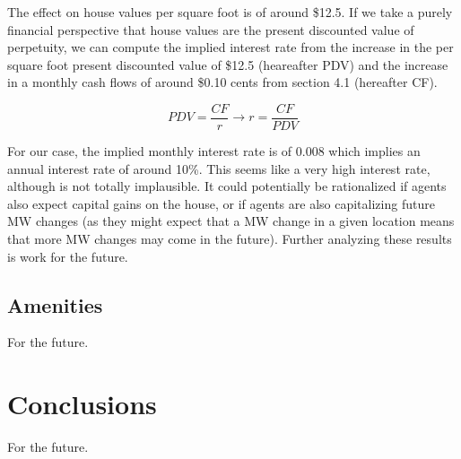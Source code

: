 \documentclass{article}
\begin{document}
The effect on house values per square foot is of around \$12.5. If we take a purely financial perspective that house values are the present discounted value of perpetuity, we can compute the implied interest rate from the increase in the per square foot present discounted value of \$12.5 (heareafter PDV) and the increase in a monthly cash flows of around \$0.10 cents from section 4.1 (hereafter CF).

\begin{equation}
    PDV = \frac{CF}{r} \to r = \frac{CF}{PDV}
\end{equation}

For our case, the implied monthly interest rate is of 0.008 which implies an annual interest rate of around 10\%. This seems like a very high interest rate, although is not totally implausible. It could potentially be rationalized if agents also expect capital gains on the house, or if agents are also capitalizing future MW changes (as they might expect that a MW change in a given location means that more MW changes may come in the future). Further analyzing these results is work for the future. 

\subsection{Amenities}

For the future. 


\section{Conclusions}

For the future.

\nocite{*}
\printbibliography



\end{document}
